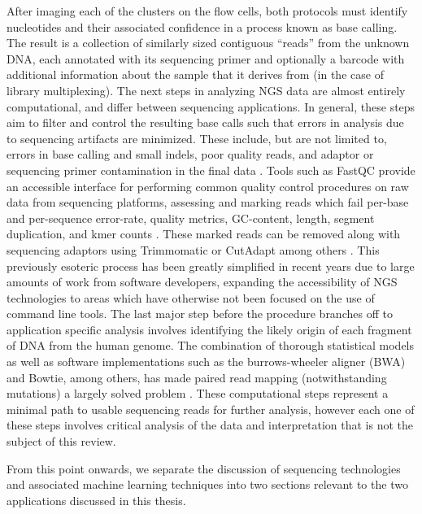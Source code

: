 After imaging each of the clusters on the flow cells, both protocols must identify nucleotides and their associated confidence in a process known as base calling. The result is a collection of similarly sized contiguous ``reads'' from the unknown DNA, each annotated with its sequencing primer and optionally a barcode with additional information about the sample that it derives from (in the case of library multiplexing). The next steps in analyzing NGS data are almost entirely computational, and differ between sequencing applications. In general, these steps aim to filter and control the resulting base calls such that errors in analysis due to sequencing artifacts are minimized. These include, but are not limited to, errors in base calling and small \glspl{indel}, poor quality reads, and adaptor or sequencing primer contamination in the final data \cite{Slatko2018}. Tools such as FastQC provide an accessible interface for performing common quality control procedures on raw data from sequencing platforms, assessing and marking reads which fail per-base and per-sequence error-rate, quality metrics, GC-content, length, segment duplication, and kmer counts \cite{Andrews2015}. These marked reads can be removed along with sequencing adaptors using Trimmomatic or CutAdapt among others \cite{Martin2011a,Bolger2014}. This previously esoteric process has been greatly simplified in recent years due to large amounts of work from software developers, expanding the accessibility of NGS technologies to areas which have otherwise not been focused on the use of command line tools. The last major step before the procedure branches off to application specific analysis involves identifying the likely origin of each fragment of DNA from the human genome. The combination of thorough statistical models as well as software implementations such as the burrows-wheeler aligner (BWA) and Bowtie, among others, has made paired read mapping (notwithstanding mutations) a largely solved problem \cite{Langmead2009,Li2009}. These computational steps represent a minimal path to usable sequencing reads for further analysis, however each one of these steps involves critical analysis of the data and interpretation that is not the subject of this review.

From this point onwards, we separate the discussion of sequencing technologies and associated machine learning techniques into two sections relevant to the two applications discussed in this thesis.


